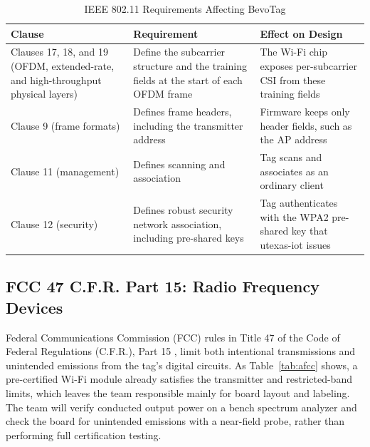 \documentclass[12pt,letterpaper]{article}
\newenvironment{spectable}{\setstretch{1.0}\renewcommand{\arraystretch}{1.1}}{}
\begin{document}
\begin{table}[H]
\caption{IEEE 802.11 Requirements Affecting BevoTag}
\label{tab:a80211}
\centering
\begin{spectable}
\begin{tabularx}{\linewidth}{@{}L{1.7in} Y Y@{}}
\toprule
\textbf{Clause} & \textbf{Requirement} & \textbf{Effect on Design} \\
\midrule
Clauses 17, 18, and 19 (OFDM, extended-rate, and high-throughput physical layers) & Define the subcarrier structure and the training fields at the start of each OFDM frame & The Wi-Fi chip exposes per-subcarrier CSI from these training fields \cite{espcsi} \\
Clause 9 (frame formats) & Defines frame headers, including the transmitter address & Firmware keeps only header fields, such as the AP address \\
Clause 11 (management) & Defines scanning and association & Tag scans and associates as an ordinary client \\
Clause 12 (security) & Defines robust security network association, including pre-shared keys & Tag authenticates with the WPA2 pre-shared key that utexas-iot issues \cite{utiot} \\
\bottomrule
\end{tabularx}
\end{spectable}
\end{table}

\subsection*{FCC 47 C.F.R. Part 15: Radio Frequency Devices}
Federal Communications Commission (FCC) rules in Title 47 of the Code of Federal Regulations
(C.F.R.), Part 15 \cite{fcc15}, limit both intentional transmissions and unintended emissions from
the tag's digital circuits. As Table~\ref{tab:afcc} shows, a pre-certified Wi-Fi module already
satisfies the transmitter and restricted-band limits, which leaves the team responsible mainly for
board layout and labeling. The team will verify conducted output power on a bench spectrum analyzer
and check the board for unintended emissions with a near-field probe, rather than performing full
certification testing.
\end{document}
